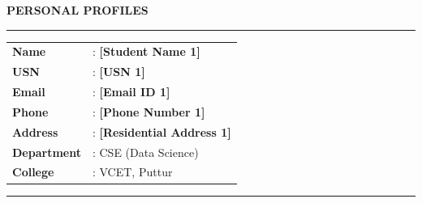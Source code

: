 \documentclass[12pt,a4paper]{report}
\begin{document}
\newpage
\thispagestyle{plain}
\begin{center}
{\Large\bfseries PERSONAL PROFILES}
\end{center}
\vspace{0.5cm}

\noindent\rule{\textwidth}{0.4pt}
\begin{minipage}[t]{0.25\textwidth}
\centering
\vspace{0.2cm}
\end{minipage}
\hfill
\begin{minipage}[t]{0.72\textwidth}
\vspace{0.2cm}
\begin{tabular}{ll}
\textbf{Name}       & : \textbf{[Student Name 1]} \\
\textbf{USN}        & : \textbf{[USN 1]} \\
\textbf{Email}      & : \textbf{[Email ID 1]} \\
\textbf{Phone}      & : \textbf{[Phone Number 1]} \\
\textbf{Address}    & : \textbf{[Residential Address 1]} \\
\textbf{Department} & : CSE (Data Science) \\
\textbf{College}    & : VCET, Puttur \\
\end{tabular}
\end{minipage}
\vspace{0.2cm}
\noindent\rule{\textwidth}{0.4pt}

\vspace{0.5cm}
\end{document}
